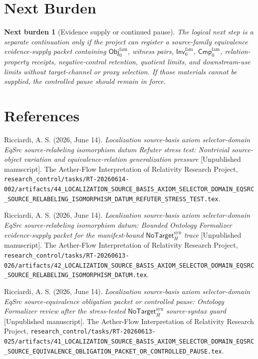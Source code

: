 \documentclass[11pt]{article}
\newcommand{\ObjFam}{\mathsf{Obj}_{0}^{\mathrm{fam}}}
\newcommand{\InvFam}{\mathsf{Inv}_{0}^{\mathrm{fam}}}
\newcommand{\CmpFam}{\mathsf{Cmp}_{0}^{\mathrm{fam}}}
\newcommand{\NoTargetSyn}{\mathsf{NoTarget}_{H}^{\mathrm{syn}}}
\newtheorem{nextburden}{Next burden}
\begin{document}
\section{Next Burden}

\begin{nextburden}[Evidence supply or continued pause]
The logical next step is a separate continuation only if the project can
register a source-family equivalence evidence-supply packet containing
\(\ObjFam\), witness pairs, \(\InvFam\), \(\CmpFam\), relation-property
receipts, negative-control retention, quotient limits, and downstream-use
limits without target-channel or proxy selection. If those materials
cannot be supplied, the controlled pause should remain in force.
\end{nextburden}

\section*{References}

Ricciardi, A. S. (2026, June 14). \emph{Localization source-basis axiom
selector-domain EqSrc source-relabeling isomorphism datum Refuter stress
test: Nontrivial source-object variation and equivalence-relation
generalization pressure} [Unpublished manuscript]. The Aether-Flow
Interpretation of Relativity Research Project,
\texttt{research\_control/tasks/RT-20260614-002/artifacts/44\_LOCALIZATION\_SOURCE\_BASIS\_AXIOM\_SELECTOR\_DOMAIN\_EQSRC\_SOURCE\_RELABELING\_ISOMORPHISM\_DATUM\_REFUTER\_STRESS\_TEST.tex}.

Ricciardi, A. S. (2026, June 14). \emph{Localization source-basis axiom
selector-domain EqSrc source-relabeling isomorphism datum: Bounded
Ontology Formalizer evidence-supply packet for the manifest-bound
\(\NoTargetSyn\) trace} [Unpublished manuscript]. The Aether-Flow
Interpretation of Relativity Research Project,
\texttt{research\_control/tasks/RT-20260613-026/artifacts/42\_LOCALIZATION\_SOURCE\_BASIS\_AXIOM\_SELECTOR\_DOMAIN\_EQSRC\_SOURCE\_RELABELING\_ISOMORPHISM\_DATUM.tex}.

Ricciardi, A. S. (2026, June 14). \emph{Localization source-basis axiom
selector-domain EqSrc source-equivalence obligation packet or controlled
pause: Ontology Formalizer review after the stress-tested
\(\NoTargetSyn\) source-syntax guard} [Unpublished manuscript]. The
Aether-Flow Interpretation of Relativity Research Project,
\texttt{research\_control/tasks/RT-20260613-025/artifacts/41\_LOCALIZATION\_SOURCE\_BASIS\_AXIOM\_SELECTOR\_DOMAIN\_EQSRC\_SOURCE\_EQUIVALENCE\_OBLIGATION\_PACKET\_OR\_CONTROLLED\_PAUSE.tex}.
\end{document}
